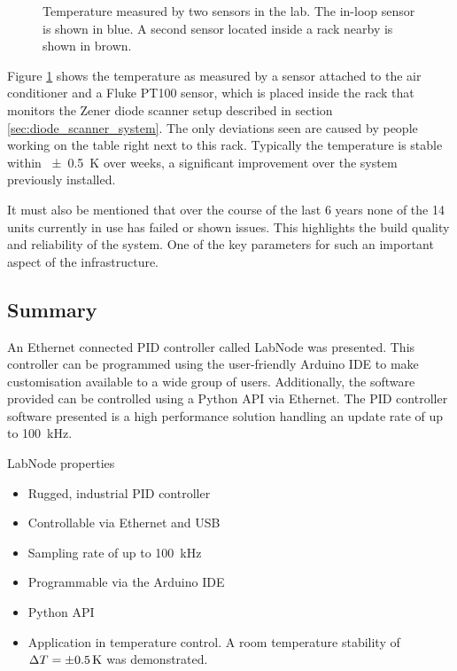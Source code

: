 \begin{figure}[ht]
    \centering
    \caption{Temperature measured by two sensors in the lab. The in-loop sensor is shown in blue. A second sensor located inside a rack nearby is shown in brown.}
    \label{fig:labnode_performance}
\end{figure}

Figure \ref{fig:labnode_performance} shows the temperature as measured by a sensor attached to the air conditioner and a Fluke  PT100 sensor, which is placed inside the rack that monitors the Zener diode scanner setup described in section \ref{sec:diode_scanner_system}. The only deviations seen are caused by people working on the table right next to this rack. Typically the temperature is stable within \qty{\pm 0.5}{\K} over weeks, a significant improvement over the system previously installed.

It must also be mentioned that over the course of the last \num{6} years none of the \num{14} units currently in use has failed or shown issues. This highlights the build quality and reliability of the system. One of the key parameters for such an important aspect of the infrastructure.

\subsection{Summary}
An Ethernet connected PID controller called LabNode was presented. This controller can be programmed using the user-friendly Arduino IDE to make customisation available to a wide group of users. Additionally, the software provided can be controlled using a Python API via Ethernet. The PID controller software presented is a high performance solution handling an update rate of up to \qty{100}{\kHz}.
\begin{center}
    \begin{deviceProperties}[label={lst:labnode_summary}]{LabNode properties}
    \begin{itemize}
        \item Rugged, industrial PID controller
        \item Controllable via Ethernet and USB
        \item Sampling rate of up to \qty{100}{\kHz}
        \item Programmable via the Arduino IDE
        \item Python API
        \item Application in temperature control. A room temperature stability of $\Delta T = \qty{\pm 0.5}{\kelvin}$ was demonstrated.
    \end{itemize}
    \end{deviceProperties}
\end{center}

